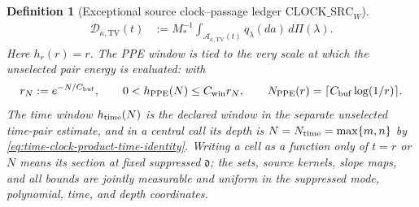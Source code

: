 \documentclass[11pt]{article}
\newtheorem{definition}[theorem]{Definition}
\begin{document}
\begin{definition}[Exceptional source clock--passage ledger
$\mathrm{CLOCK\_SRC}_{W}$]
\begin{align}
 \mathcal D_{\kappa,\mathrm{TV}}(t)&:=M_*^{-1}
  \int_{\mathcal A_{\kappa,\mathrm{TV}}(t)}
       q_\lambda(da)\,d\Pi(\lambda).
 \label{eq:clock-source-partition}
\end{align}
Here $h_r(r)=r$.  The PPE window is tied to the very scale at which the
unselected pair energy is evaluated: with
\begin{equation}
\label{eq:ppe-clock-window-scale}
 r_N:=e^{-N/C_{\rm buf}},\qquad
 0<h_{\rm PPE}(N)\le C_{\rm win}r_N,\qquad
 N_{\rm PPE}(r)=\lceil C_{\rm buf}\log(1/r)\rceil .
\end{equation}
The time window $h_{\rm time}(N)$ is the declared window in the separate
unselected time-pair estimate, and in a central call its depth is
$N=N_{\rm time}=\max\{m,n\}$ by
\eqref{eq:time-clock-product-time-identity}.  Writing a cell as a function
only of $t=r$ or $N$ means its section at fixed suppressed $\mathfrak d$;
the sets, source kernels, slope maps, and all bounds are jointly measurable
and uniform in the suppressed mode, polynomial, time, and depth coordinates.


\end{definition}
\end{document}
